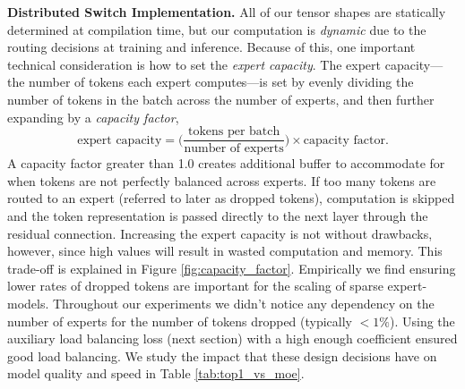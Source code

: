 \documentclass[twoside,11pt]{article}
\begin{document}
\textbf{Distributed Switch Implementation.}
All of our tensor shapes are statically determined at compilation time, but our computation is \emph{dynamic} due to the routing decisions at training and inference.
Because of this, one important technical consideration is how to set the \emph{expert capacity}.
The expert capacity---the number of tokens each expert computes---is set by evenly dividing the number of tokens in the batch across the number of experts, and then further expanding by a \emph{capacity factor},
\begin{equation}
\text{expert capacity} = \biggr(\frac{\text{tokens per batch}}{\text{number of experts}}\biggr) \times \text{capacity factor}.
\end{equation}
A capacity factor greater than 1.0 creates additional buffer to accommodate for when tokens are not perfectly balanced across experts.
If too many tokens are routed to an expert (referred to later as dropped tokens), computation is skipped and the token representation is passed directly to the next layer through the residual connection.
Increasing the expert capacity is not without drawbacks, however, since high values will result in wasted computation and memory.
This trade-off is explained in Figure \ref{fig:capacity_factor}.
Empirically we find ensuring lower rates of dropped tokens are important for the scaling of sparse expert-models. Throughout our experiments we didn't notice any dependency on the number of experts for the number of tokens dropped (typically $<1\%$). Using the auxiliary load balancing loss (next section) with a high enough coefficient ensured good load balancing.
We study the impact that these design decisions have on model quality and speed  in Table \ref{tab:top1_vs_moe}.


\end{document}
